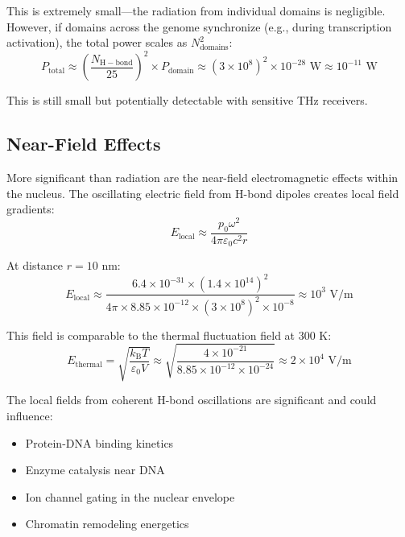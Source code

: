 \documentclass[twocolumn,10pt]{article}
\theoremstyle{remark}
\newcommand{\kB}{k_{\mathrm{B}}}
\begin{document}
This is extremely small---the radiation from individual domains is negligible. However, if domains across the genome synchronize (e.g., during transcription activation), the total power scales as $N_{\mathrm{domains}}^2$:
\begin{equation}
P_{\mathrm{total}} \approx \left(\frac{N_{\mathrm{H-bond}}}{25}\right)^2 \times P_{\mathrm{domain}} \approx (3 \times 10^8)^2 \times 10^{-28} \text{ W} \approx 10^{-11} \text{ W}
\end{equation}

This is still small but potentially detectable with sensitive THz receivers.

\subsection{Near-Field Effects}

More significant than radiation are the near-field electromagnetic effects within the nucleus. The oscillating electric field from H-bond dipoles creates local field gradients:
\begin{equation}
E_{\mathrm{local}} \approx \frac{p_0 \omega^2}{4\pi\varepsilon_0 c^2 r}
\end{equation}

At distance $r = 10$ nm:
\begin{equation}
E_{\mathrm{local}} \approx \frac{6.4 \times 10^{-31} \times (1.4 \times 10^{14})^2}{4\pi \times 8.85 \times 10^{-12} \times (3 \times 10^8)^2 \times 10^{-8}} \approx 10^3 \text{ V/m}
\end{equation}

This field is comparable to the thermal fluctuation field at 300 K:
\begin{equation}
E_{\mathrm{thermal}} = \sqrt{\frac{\kB T}{\varepsilon_0 V}} \approx \sqrt{\frac{4 \times 10^{-21}}{8.85 \times 10^{-12} \times 10^{-24}}} \approx 2 \times 10^4 \text{ V/m}
\end{equation}

The local fields from coherent H-bond oscillations are significant and could influence:
\begin{itemize}
\item Protein-DNA binding kinetics
\item Enzyme catalysis near DNA
\item Ion channel gating in the nuclear envelope
\item Chromatin remodeling energetics
\end{itemize}
\end{document}
